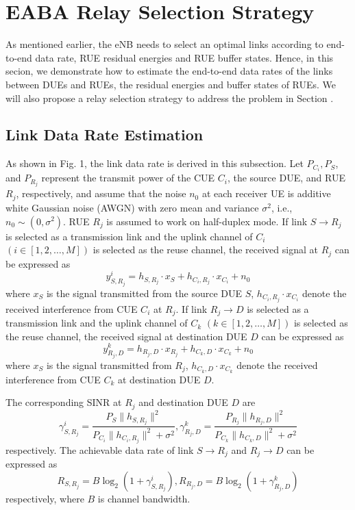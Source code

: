 \documentclass[conference]{IEEEtran}
\begin{document}
\section{EABA Relay Selection Strategy}
As mentioned earlier, the eNB needs to select an optimal links according to end-to-end data rate, RUE residual energies and RUE buffer states. Hence, in this secion, we demonstrate how to estimate the end-to-end data rates of the links between DUEs and RUEs, the residual energies and buffer states of RUEs. We will also propose a relay selection strategy to address the problem in Section \uppercase\expandafter{}.

\subsection{Link Data Rate Estimation}
As shown in Fig. 1, the link data rate is derived in this subsection. Let $P_{C_i},P_S$, and $P_{R_j}$ represent the transmit power of the CUE $C_i$, the source DUE, and RUE $R_j$, respectively, and assume that the noise $n_0$ at each receiver UE is additive white Gaussian noise (AWGN) with zero mean and variance $\sigma^2$, i.e., $n_0 \sim (0,\sigma^2)$. RUE $R_j$ is assumed to work on half-duplex mode. If link $S \rightarrow R_j$ is selected as a transmission link and the uplink channel of $C_i$ $(i \in [1,2,\ldots,M])$ is selected as the reuse channel, the received signal at $R_j$ can be expressed as
\begin{equation}
y^i_{S,R_j} = h_{S,R_j}\cdot x_S + h_{C_i,R_j}\cdot x_{C_i} + n_0
\end{equation}
where $x_S$ is the signal transmitted from the source DUE $S$, $h_{C_i,R_j}\cdot x_{C_i}$ denote the received interference from CUE $C_i$ at $R_j$. If link $R_j \rightarrow D$ is selected as a transmission link and the uplink channel of $C_k$ $(k \in [1,2,\ldots,M])$ is selected as the reuse channel, the received signal at destination DUE $D$ can be expressed as
\begin{equation}
y^k_{R_j,D} = h_{R_j,D}\cdot x_{R_j} + h_{C_k,D}\cdot x_{C_k} + n_0
\end{equation}
where $x_S$ is the signal transmitted from $R_j$, $h_{C_k,D}\cdot x_{C_k}$ denote the received interference from CUE $C_k$ at destination DUE $D$.

The corresponding SINR at $R_j$ and destination DUE $D$ are
\begin{equation}
\gamma^{i}_{S,R_j} = \frac{P_S\|{h_{S,R_j}}\|^{2}}{P_{C_i}\|{h_{C_i,R_j}}\|^{2} + \sigma^2} ,\gamma^{k}_{R_j,D} = \frac{P_{R_j}\|{h_{R_j,D}}\|^{2}}{P_{C_k}\|{h_{C_k,D}}\|^{2} + \sigma^2}
\end{equation}
respectively. The achievable data rate of link $S \rightarrow R_j$ and $R_j \rightarrow D$ can be expressed as
\begin{equation}
R_{S,R_j} = B\log_2(1 + \gamma^{i}_{S,R_{j}}),R_{R_j,D} = B\log_2(1 + \gamma^{k}_{R_j,D})
\end{equation}
respectively, where $B$ is channel bandwidth.
\end{document}
